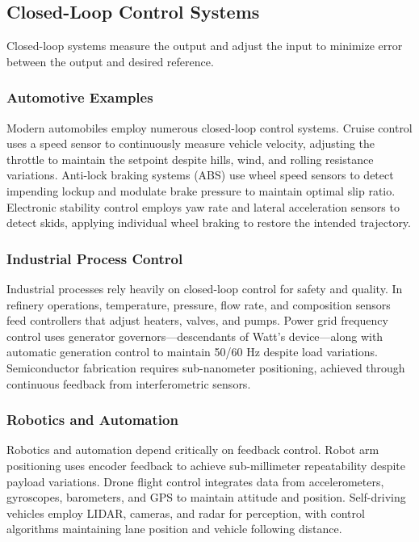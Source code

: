 \subsection{Closed-Loop Control Systems}

Closed-loop systems measure the output and adjust the input to minimize error between the output and desired reference.

\subsubsection{Automotive Examples}
Modern automobiles employ numerous closed-loop control systems. Cruise control uses a speed sensor to continuously measure vehicle velocity, adjusting the throttle to maintain the setpoint despite hills, wind, and rolling resistance variations. Anti-lock braking systems (ABS) use wheel speed sensors to detect impending lockup and modulate brake pressure to maintain optimal slip ratio. Electronic stability control employs yaw rate and lateral acceleration sensors to detect skids, applying individual wheel braking to restore the intended trajectory.

\subsubsection{Industrial Process Control}
Industrial processes rely heavily on closed-loop control for safety and quality. In refinery operations, temperature, pressure, flow rate, and composition sensors feed controllers that adjust heaters, valves, and pumps. Power grid frequency control uses generator governors---descendants of Watt's device---along with automatic generation control to maintain 50/60 Hz despite load variations. Semiconductor fabrication requires sub-nanometer positioning, achieved through continuous feedback from interferometric sensors.

\subsubsection{Robotics and Automation}
Robotics and automation depend critically on feedback control. Robot arm positioning uses encoder feedback to achieve sub-millimeter repeatability despite payload variations. Drone flight control integrates data from accelerometers, gyroscopes, barometers, and GPS to maintain attitude and position. Self-driving vehicles employ LIDAR, cameras, and radar for perception, with control algorithms maintaining lane position and vehicle following distance.

